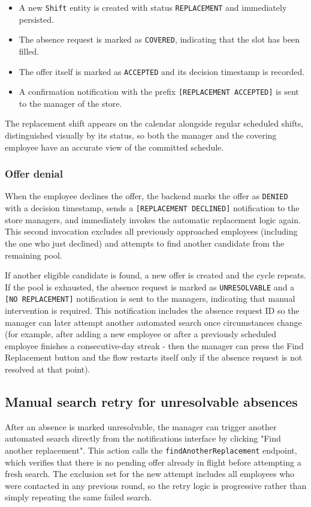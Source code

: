 \begin{itemize}
    \item A new \texttt{Shift} entity is created with status \texttt{REPLACEMENT} and immediately persisted.
    \item The absence request is marked as \texttt{COVERED}, indicating that the slot has been filled.
    \item The offer itself is marked as \texttt{ACCEPTED} and its decision timestamp is recorded.
    \item A confirmation notification with the prefix \texttt{[REPLACEMENT ACCEPTED]} is sent to the manager of the store.
\end{itemize}

\par The replacement shift appears on the calendar alongside regular scheduled shifts, distinguished visually by its status, so both the manager and the covering employee have an accurate view of the committed schedule.

\subsubsection*{Offer denial}
\par When the employee declines the offer, the backend marks the offer as \texttt{DENIED} with a decision timestamp, sends a \texttt{[REPLACEMENT DECLINED]} notification to the store managers, and immediately invokes the automatic replacement logic again. This second invocation excludes all previously approached employees (including the one who just declined) and attempts to find another candidate from the remaining pool.

\par If another eligible candidate is found, a new offer is created and the cycle repeats. If the pool is exhausted, the absence request is marked as \texttt{UNRESOLVABLE} and a \texttt{[NO REPLACEMENT]} notification is sent to the managers, indicating that manual intervention is required. This notification includes the absence request ID so the manager can later attempt another automated search once circumstances change (for example, after adding a new employee or after a previously scheduled employee finishes a consecutive-day streak - then the manager can press the Find Replacement button and the flow restarts itself only if the absence request is not resolved at that point).

\subsection{Manual search retry for unresolvable absences}
\par After an absence is marked unresolvable, the manager can trigger another automated search directly from the notifications interface by clicking "Find another replacement". This action calls the \texttt{findAnotherReplacement} endpoint, which verifies that there is no pending offer already in flight before attempting a fresh search. The exclusion set for the new attempt includes all employees who were contacted in any previous round, so the retry logic is progressive rather than simply repeating the same failed search.

